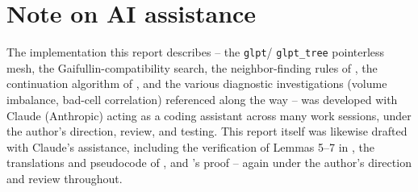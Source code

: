\documentclass[11pt]{article}
\begin{document}
\section*{Note on AI assistance}

The implementation this report describes -- the \texttt{glpt}/
\texttt{glpt\_tree} pointerless mesh, the Gaifullin-compatibility search,
the neighbor-finding rules of , the continuation algorithm
of , and the various diagnostic investigations
(volume imbalance, bad-cell correlation) referenced along the way -- was
developed with Claude (Anthropic) acting as a coding assistant across many
work sessions, under the author's direction, review, and testing. This
report itself was likewise drafted with Claude's assistance, including
the verification of Lemmas 5--7 in , the translations
and pseudocode of , and 's proof --
again under the author's direction and review throughout.
\end{document}
